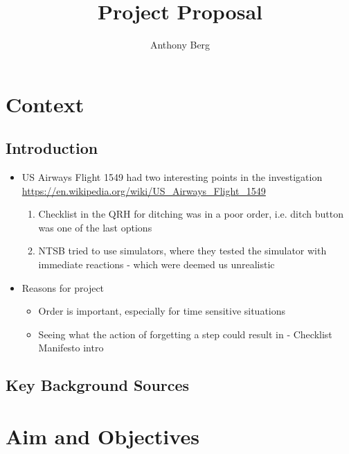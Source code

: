 \documentclass[a4paper]{article}
\author{Anthony Berg}
\title{Project Proposal}
\begin{document}
\begin{titlepage}
    \clearpage\maketitle
    \thispagestyle{empty}
\end{titlepage}

\section{Context}
\subsection{Introduction}
\begin{itemize}
    \item US Airways Flight 1549 had two interesting points in the investigation
        \url{https://en.wikipedia.org/wiki/US_Airways_Flight_1549}
        \begin{enumerate}
            \item Checklist in the QRH for ditching was in a poor order,
                i.e. ditch button was one of the last options
            \item NTSB tried to use simulators, where they tested
                the simulator with immediate reactions - which were
                deemed us unrealistic
        \end{enumerate}
    \item Reasons for project
        \begin{itemize}
            \item Order is important, especially for time sensitive
                situations
            \item Seeing what the action of forgetting a step could
                result in - Checklist Manifesto intro
        \end{itemize}
\end{itemize}

\subsection{Key Background Sources}


\section{Aim and Objectives}
\end{document}
